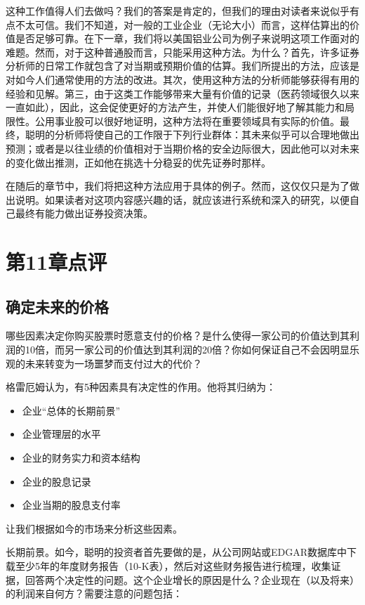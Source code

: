 \documentclass[12pt,oneside]{book}
\begin{document}
这种工作值得人们去做吗？我们的答案是肯定的，但我们的理由对读者来说似乎有点不太可信。我们不知道，对一般的工业企业（无论大小）而言，这样估算出的价值是否足够可靠。在下一章，我们将以美国铝业公司为例子来说明这项工作面对的难题。然而，对于这种普通股而言，只能采用这种方法。为什么？首先，许多证券分析师的日常工作就包含了对当期或预期价值的估算。我们所提出的方法，应该是对如今人们通常使用的方法的改进。其次，使用这种方法的分析师能够获得有用的经验和见解。第三，由于这类工作能够带来大量有价值的记录（医药领域很久以来一直如此），因此，这会促使更好的方法产生，并使人们能很好地了解其能力和局限性。公用事业股可以很好地证明，这种方法将在重要领域具有实际的价值。最终，聪明的分析师将使自己的工作限于下列行业群体：其未来似乎可以合理地做出预测；或者是以往业绩的价值相对于当期价格的安全边际很大，因此他可以对未来的变化做出推测，正如他在挑选十分稳妥的优先证券时那样。

在随后的章节中，我们将把这种方法应用于具体的例子。然而，这仅仅只是为了做出说明。如果读者对这项内容感兴趣的话，就应该进行系统和深入的研究，以便自己最终有能力做出证券投资决策。


\section{第11章点评}
\subsection{确定未来的价格}
哪些因素决定你购买股票时愿意支付的价格？是什么使得一家公司的价值达到其利润的10倍，而另一家公司的价值达到其利润的20倍？你如何保证自己不会因明显乐观的未来转变为一场噩梦而支付过大的代价？

格雷厄姆认为，有5种因素具有决定性的作用。他将其归纳为：

\begin{itemize}
\item 企业“总体的长期前景”
\item 企业管理层的水平
\item 企业的财务实力和资本结构
\item 企业的股息记录
\item 企业当期的股息支付率
\end{itemize}

让我们根据如今的市场来分析这些因素。

长期前景。如今，聪明的投资者首先要做的是，从公司网站或EDGAR数据库中下载至少5年的年度财务报告（10-K表），然后对这些财务报告进行梳理，收集证据，回答两个决定性的问题。这个企业增长的原因是什么？企业现在（以及将来）的利润来自何方？需要注意的问题包括：
\end{document}

